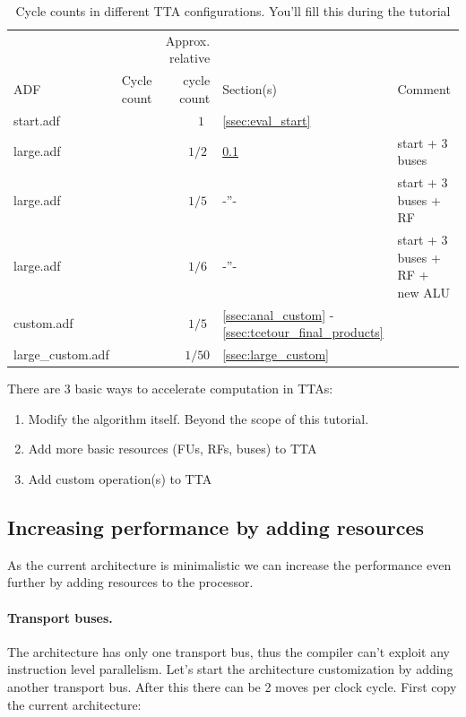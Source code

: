 \documentclass[twoside]{tceusermanual}
\begin{document}
\begin{table}[b]
  \begin{center}
    \caption {Cycle counts in different TTA configurations. You'll fill this during the tutorial}
    \label {tab:cyclecounts}
    \begin{tabular}{l  l r |  l l }
      \hline
          &             & Approx. relative &            &          \\
      ADF & Cycle count & cycle count      & Section(s) &  Comment \\
      \hline
      \hline
      start.adf            &  & $1~~$  & \ref{ssec:eval_start} & \\ %
      \hline
      large.adf            &  & $1/2~$ & \ref{ssec:large} & start + 3 buses \\ %
      large.adf            &  & $1/5~$ & -''-             & start + 3 buses + RF \\%
      large.adf            &  & $1/6~$ & -''-             & start + 3 buses + RF + new ALU \\ %
      \hline
      custom.adf           &  & $1/5~$ & \ref{ssec:anal_custom} - \ref{ssec:tcetour_final_products} \\ %
      \hline
      large\_custom.adf    &  & $1/50$ & \ref{ssec:large_custom} \\ %
      \hline
    \end{tabular}
  \end{center}
\end{table}



There are 3 basic ways to accelerate computation in TTAs:
\begin{enumerate}
\item Modify the algorithm itself. Beyond the scope of this tutorial.
\item Add more basic resources (FUs, RFs, buses) to TTA
\item Add custom operation(s) to TTA
\end{enumerate}


\subsection{Increasing performance by adding resources}
\label{ssec:large}
As the current architecture is minimalistic we can increase the performance
even further by adding resources to the processor.

\paragraph{Transport buses.} 
The architecture has only one transport bus, thus the compiler can't exploit 
any instruction level parallelism. Let's start the architecture customization by 
adding another transport bus. After this there can be 2 moves per clock cycle. 
First copy the current architecture:
\end{document}
